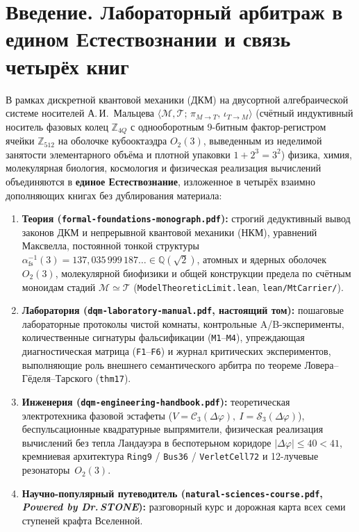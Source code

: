 
\chapter*{Введение. Лабораторный арбитраж в едином Естествознании и связь четырёх книг}

В рамках дискретной квантовой механики (ДКМ) на двусортной алгебраической системе носителей А.\,И.~Мальцева $\langle\mathcal{M},\mathcal{T};\,\pi_{M\to T},\,\iota_{T\to M}\rangle$ (счётный индуктивный носитель фазовых колец $\mathbb{Z}_{4Q}$ с однооборотным 9-битным фактор-регистром ячейки $\mathbb{Z}_{512}$ на оболочке кубооктаэдра $O_2(3)$, выведенным из неделимой занятости элементарного объёма и плотной упаковки $1 + 2^3 = 3^2$) физика, химия, молекулярная биология, космология и физическая реализация вычислений объединяются в \textbf{единое Естествознание}, изложенное в четырёх взаимно дополняющих книгах без дублирования материала:
\begin{enumerate}[label=\textbf{Книга~\Roman*.},leftmargin=*,noitemsep]
\item \textbf{Теория (\texttt{formal-foundations-monograph.pdf}):} строгий дедуктивный вывод законов ДКМ и непрерывной квантовой механики (НКМ), уравнений Максвелла, постоянной тонкой структуры $\alpha_{\mathrm{fs}}^{-1}(3) = 137{,}035\,999\,187\dots \in \mathbb{Q}(\sqrt{2})$, атомных и ядерных оболочек $O_2(3)$, молекулярной биофизики и общей конструкции предела по счётным моноидам стадий $\mathcal{M}\simeq\mathcal{T}$ (\texttt{ModelTheoreticLimit.lean}, \texttt{lean/MtCarrier/}).
\item \textbf{Лаборатория (\texttt{dqm-laboratory-manual.pdf}, настоящий том):} пошаговые лабораторные протоколы чистой комнаты, контрольные A/B-эксперименты, количественные сигнатуры фальсификации (\texttt{M1}--\texttt{M4}), упреждающая диагностическая матрица (\texttt{F1}--\texttt{F6}) и журнал критических экспериментов, выполняющие роль внешнего семантического арбитра по теореме Ловера--Гёделя--Тарского (\texttt{thm17}).
\item \textbf{Инженерия (\texttt{dqm-engineering-handbook.pdf}):} теоретическая электротехника фазовой эстафеты ($V = \mathcal{C}_3(\Delta\varphi),\ I = \mathcal{S}_3(\Delta\varphi)$), беспульсационные квадратурные выпрямители, физическая реализация вычислений без тепла Ландауэра в беспотерьном коридоре $|\Delta\varphi|\le 40 < 41$, кремниевая архитектура \texttt{Ring9} / \texttt{Bus36} / \texttt{VerletCell72} и 12-лучевые резонаторы~$O_2(3)$.
\item \textbf{Научно-популярный путеводитель (\texttt{natural-sciences-course.pdf}, \emph{Powered by Dr.\,STONE}):} разговорный курс и дорожная карта всех семи ступеней крафта Вселенной.
\end{enumerate}
